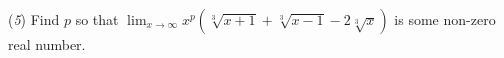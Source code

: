 (\textit{5}) Find $ p$ so that $ \lim_{x\rightarrow\infty}x^p\left(\sqrt[3]{x+1}+\sqrt[3]{x-1}-2\sqrt[3]{x}\right)$ is some non-zero real number.